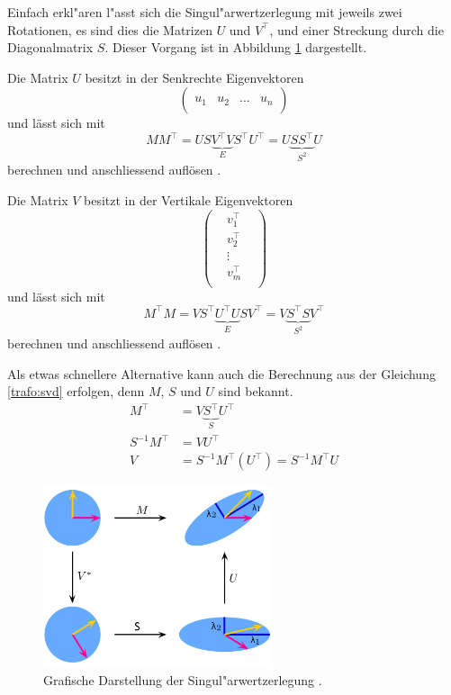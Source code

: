 \begin{refsection}
Einfach erkl"aren l"asst sich die Singul"arwertzerlegung mit jeweils zwei Rotationen, es sind dies die Matrizen $U$ und $V^\top$, und einer Streckung durch die Diagonalmatrix $S$. Dieser Vorgang ist in Abbildung \ref{trafo:SVDFig} dargestellt. 

Die Matrix $U$ besitzt in der Senkrechte Eigenvektoren
\begin{equation*}
	\left( 
		\begin{array}{cccc}
		& & & \\
		u_1 & u_2 & \dots & u_n  \\
		& & & 			
		\end{array}
	\right) 
\end{equation*}
und lässt sich mit 
\begin{equation*}
	M M^\top = U S \underbrace{V^\top V}_{E} S^\top U^\top = U \underbrace{S S^\top}_{S^2} U
\end{equation*}
berechnen und anschliessend auflösen \cite{tafo:Watkins}.

Die Matrix $V$ besitzt in der Vertikale Eigenvektoren
\begin{equation*}
	\left( 
		\begin{array}{ccc}
		& v_1^\top & \\
		& v_2^\top & \\
		& \vdots & \\
		&  v_m^\top & \\			
		\end{array}
	\right) 
\end{equation*}
und lässt sich mit 
\begin{equation*}
	M^\top M = V S^\top \underbrace{U^\top U}_{E} S V^\top = V \underbrace{S^\top S}_{S^2} V^\top 
\end{equation*}
berechnen und anschliessend auflösen \cite{trafo:Watkins}.

Als etwas schnellere Alternative kann auch die Berechnung aus der Gleichung \ref{trafo:svd} erfolgen, denn $M$, $S$ und $U$ sind bekannt. 
\begin{align*}
	M^\top &= V \underbrace{S^\top}_{S} U^\top\\
	S^{-1} M^\top &= V U^\top\\
	V &= S^{-1} M^\top \left(U^\top\right) = S^{-1} M^\top U
\end{align*}

\begin{figure}
	\centering
	\includegraphics[width=0.6\textwidth]{./trafo/images/svd.png}
	\caption{Grafische Darstellung der Singul"arwertzerlegung \cite{trafo:SVDWiki}.}
	\label{trafo:SVDFig}
\end{figure}


\end{refsection}
